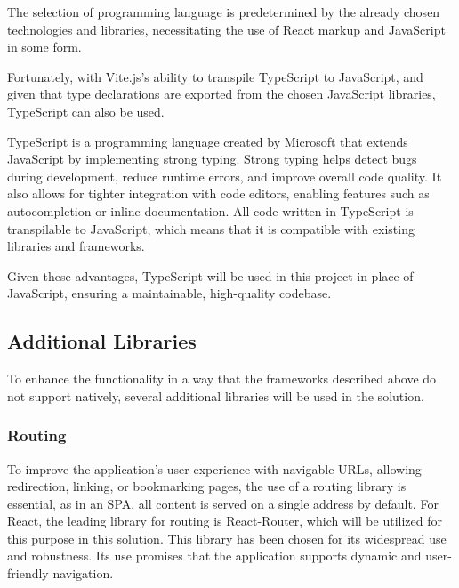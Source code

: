 The selection of programming language is predetermined by the already chosen technologies and libraries, necessitating the use of React markup and JavaScript in some form.

Fortunately, with Vite.js's ability to transpile TypeScript to JavaScript, and given that type declarations are exported from the chosen JavaScript libraries, TypeScript can also be used. \cite{Said2023}

TypeScript is a programming language created by Microsoft that extends JavaScript by implementing strong typing. Strong typing helps detect bugs during development, reduce runtime errors, and improve overall code quality. It also allows for tighter integration with code editors, enabling features such as autocompletion or inline documentation. All code written in TypeScript is transpilable to JavaScript, which means that it is compatible with existing libraries and frameworks. \cite{TypeScript}

Given these advantages, TypeScript will be used in this project in place of JavaScript, ensuring a maintainable, high-quality codebase.


\subsection{Additional Libraries}

To enhance the functionality in a way that the frameworks described above do not support natively, several additional libraries will be used in the solution.

\subsubsection{Routing} \label{section:react-router}

To improve the application's user experience with navigable URLs, allowing redirection, linking, or bookmarking pages, the use of a routing library is essential, as in an SPA, all content is served on a single address by default. For React, the leading library for routing is React-Router, which will be utilized for this purpose in this solution. This library has been chosen for its widespread use and robustness. Its use promises that the application supports dynamic and user-friendly navigation. \cite{Ganatra2018}

